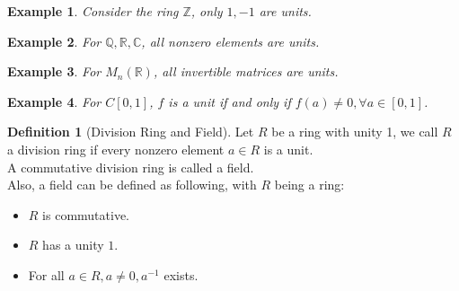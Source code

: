 \documentclass{article}
\theoremstyle{MyNonumberplain}
\theoremstyle{break}
\theoremstyle{break}
\newtheorem{example}{Example}[section]
\theoremstyle{break}
\theoremstyle{definition}
\theoremstyle{break}
\newtheorem{definition}{Definition}[section]
\begin{document}
\begin{expbox}
    \begin{example}
        Consider the ring $\mathbb{Z}$, only $1, - 1$ are units.
    \end{example}
\end{expbox}

\begin{expbox}
    \begin{example}
        For $\mathbb{Q}, \mathbb{R}, \mathbb{C}$, all nonzero elements are units.
    \end{example}
\end{expbox}

\begin{expbox}
    \begin{example}
        For $M_n (\mathbb{R})$, all invertible matrices are units.
    \end{example}
\end{expbox}

\begin{expbox}
    \begin{example}
        For $C [0, 1]$, $f$ is a unit if and only if $f (a) \neq 0, \forall a \in [0, 1]$.
    \end{example}
\end{expbox}

\begin{defbox}
    \begin{definition}[Division Ring and Field]
        Let $R$ be a ring with unity 1, we call $R$ a division ring if every nonzero
        element $a \in R$ is a unit.\\
        
        A commutative division ring is called a field.\\
        
        Also, a field can be defined as following, with $R$ being a ring:\\
        \begin{itemize}
          \item $R$ is commutative.\\
          
          \item $R$ has a unity $1$.\\
          
          \item For all $a \in R, a \neq 0, a^{- 1}$ exists.
        \end{itemize}
    \end{definition}
\end{defbox}
\end{document}
